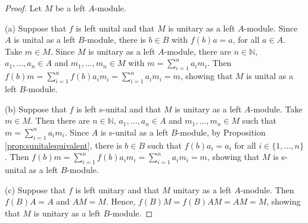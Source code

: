 \documentclass[12pt]{amsart}
\theoremstyle{definition}
\newcommand{\N}{\mathbb{N}}
\begin{document}
\begin{proof}
Let $M$ be a left $A$-module.

(a) Suppose that $f$ is left unital and
that $M$ is unitary as a left $A$-module. 
Since $A$ is unital as a left $B$-module,
there is $b \in B$ with $f(b)a = a$,
for all $a \in A$.
Take $m \in M$. Since $M$ is unitary
as a left $A$-module, there are $n \in \N$,
$a_1,\ldots,a_n \in A$ and 
$m_1,\ldots,m_n \in M$ with 
$m = \sum_{i=1}^n a_i m_i$. Then
$f(b)m = \sum_{i=1}^n f(b) a_i m_i = 
\sum_{i=1}^n a_i m_i = m$,
showing that $M$ is unital as a 
left $B$-module.

(b) Suppose that $f$ is left s-unital and
that $M$ is unitary as a left $A$-module.
Take $m \in M$. Then there are
$n \in \N$,
$a_1,\ldots,a_n \in A$ and 
$m_1,\ldots,m_n \in M$ such that
$m = \sum_{i=1}^n a_i m_i$.
Since $A$ is s-unital as a left $B$-module,
by Proposition \ref{prop:sunitalequivalent},
there is $b \in B$ such that
$f(b) a_i = a_i$ for all 
$i \in \{ 1,\ldots,n \}$.
Then $f(b) m = 
\sum_{i=1}^n f(b) a_i m_i = 
\sum_{i=1}^n a_i m_i = m$, 
showing that $M$ is s-unital as a
left $B$-module.

(c) Suppose that $f$ is left unitary and
that $M$ unitary as a left $A$-module.
Then $f(B)A = A$ and $AM = M$. Hence,
$f(B)M = f(B)AM = AM = M$, showing that 
$M$ is unitary as a left $B$-module.


\end{proof}
\end{document}
